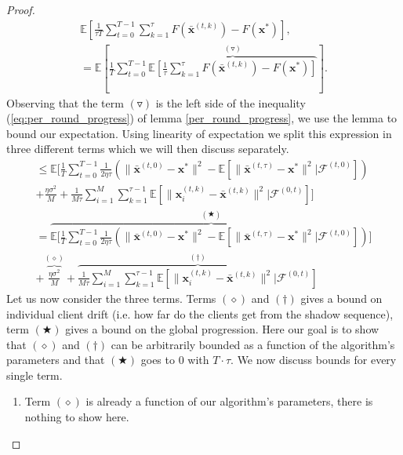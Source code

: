 \begin{proof}
    \begin{align*}
        \mathbb{E} \left[ \frac{1}{\tau T} \sum_{t=0}^{T-1}\sum_{k=1}^{\tau} F(\bar{\bm{x}}^{(t,k)}) - F(\bm{x}^*)\right], \\
        = \mathbb{E} \left[\frac{1}{T} \sum^{T-1}_{t=0} \overbrace{\mathbb{E} \left[ \frac{1}{\tau} \sum_{k=1}^{\tau} F(\bar{\bm{x}}^{(t,k)}) - F(\bm{x}^*)\right] }^{(\triangledown)}\right].
    \end{align*}
    Observing that the term $(\triangledown)$ is the left side of the inequality (\ref{eq:per_round_progress}) of lemma \ref{per_round_progress}, we use the lemma to bound our expectation. Using linearity of expectation we split this expression in three different terms which we will then discuss separately.
    \begin{align*}
    \leq \mathbb{E}
        \Bigg[ \frac{1}{T} \sum_{t=0}^{T-1} \frac{1}{2 \eta \tau} \left( \| \bar{\bm{x}}^{(t,0)} -\bm{x}^{*} \|^2 - \mathbb{E}\left[  \| \bar{\bm{x}}^{(t,\tau)} -\bm{x}^{*} \|^2  | \mathcal{F}^{(t,0)}\right]  \right) \\
        + \frac{\eta \sigma^2}{M} + \frac{1}{M \tau} \sum^M_{i=1} \sum^{\tau-1}_{k=1} \mathbb{E} \left[ \| \bm{x}_i^{(t,k)} -\bar{\bm{x}}^{(t,k)} \|^2 | \mathcal{F}^{(0,t)}\right] \Bigg] \\
        = \overbrace{\mathbb{E}\Bigg[ \frac{1}{T} \sum_{t=0}^{T-1} \frac{1}{2 \eta \tau} \left( \| \bar{\bm{x}}^{(t,0)} -\bm{x}^{*} \|^2 - \mathbb{E}\left[  \| \bar{\bm{x}}^{(t,\tau)} -\bm{x}^{*} \|^2  | \mathcal{F}^{(t,0)}\right] \right) \Bigg]}^{(\bigstar)} \\
        + \overbrace{\frac{\eta \sigma^2}{M}}^{(\diamond)} +  \overbrace{\frac{1}{M \tau}\sum^M_{i=1} \sum^{\tau-1}_{k=1} \mathbb{E} \left[ \| \bm{x}_i^{(t,k)} -\bar{\bm{x}}^{(t,k)} \|^2 | \mathcal{F}^{(0,t)}\right] }^{(\dagger)}
    \end{align*}
    Let us now consider the three terms. Terms $(\diamond)$ and $(\dagger)$ gives a bound on individual client drift (i.e. how far do the clients get from the shadow sequence), term $(\bigstar)$ gives a bound on the global progression. Here our goal is to show that $(\diamond)$ and $(\dagger)$ can be arbitrarily bounded as a function of the algorithm's parameters and that $(\bigstar)$ goes to $0$ with $T\cdot \tau$. We now discuss bounds for every single term.
    \begin{enumerate}
        \item Term $(\diamond)$ is already a function of our algorithm's parameters, there is nothing to show here.

\end{enumerate}
\end{proof}

